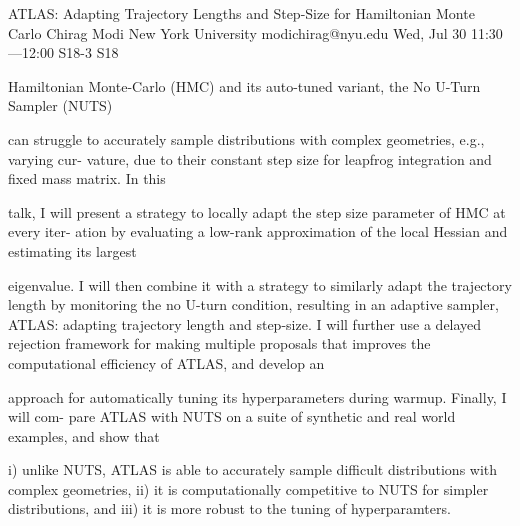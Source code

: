 \begin{talk}
  {ATLAS: Adapting Trajectory Lengths and Step-Size for Hamiltonian Monte Carlo}%
  {Chirag Modi}%
  {New York University}%
  {modichirag@nyu.edu}%
  {}%
  {}%
  {Wed, Jul 30 11:30---12:00}%
  {S18-3}%
  {S18}%
  {}%
  
    

Hamiltonian Monte-Carlo (HMC) and its auto-tuned variant, the No U-Turn Sampler (NUTS)

can struggle to accurately sample distributions with complex geometries, e.g., varying cur-
vature, due to their constant step size for leapfrog integration and fixed mass matrix. In this

talk, I will present a strategy to locally adapt the step size parameter of HMC at every iter-
ation by evaluating a low-rank approximation of the local Hessian and estimating its largest

eigenvalue. I will then combine it with a strategy to similarly adapt the trajectory length
by monitoring the no U-turn condition, resulting in an adaptive sampler, ATLAS: adapting
trajectory length and step-size. I will further use a delayed rejection framework for making
multiple proposals that improves the computational efficiency of ATLAS, and develop an

approach for automatically tuning its hyperparameters during warmup. Finally, I will com-
pare ATLAS with NUTS on a suite of synthetic and real world examples, and show that

i) unlike NUTS, ATLAS is able to accurately sample difficult distributions with complex
geometries, ii) it is computationally competitive to NUTS for simpler distributions, and iii)
it is more robust to the tuning of hyperparamters.
\medskip

\end{talk}

